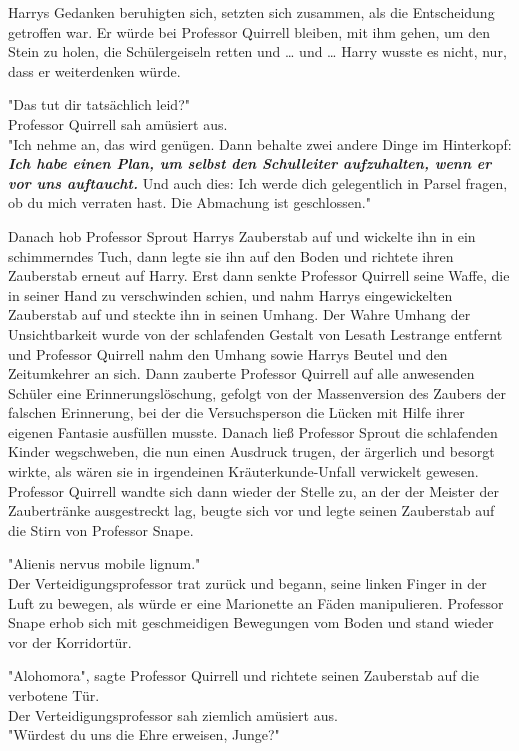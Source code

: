 {Harrys Gedanken beruhigten sich, setzten sich zusammen, als die Entscheidung getroffen war. Er würde bei Professor Quirrell bleiben, mit ihm gehen, um den Stein zu holen, die Schülergeiseln retten und … und … Harry wusste es nicht, nur, dass er weiterdenken würde.

"Das tut dir tatsächlich leid?"\\ Professor Quirrell sah amüsiert aus.\\ "Ich nehme an, das wird genügen. Dann behalte zwei andere Dinge im Hinterkopf: \textbf{\emph{Ich habe einen Plan, um selbst den Schulleiter aufzuhalten, wenn er vor uns auftaucht.}} Und auch dies: Ich werde dich gelegentlich in Parsel fragen, ob du mich verraten hast. Die Abmachung ist geschlossen."

Danach hob Professor Sprout Harrys Zauberstab auf und wickelte ihn in ein schimmerndes Tuch, dann legte sie ihn auf den Boden und richtete ihren Zauberstab erneut auf Harry. Erst dann senkte Professor Quirrell seine Waffe, die in seiner Hand zu verschwinden schien, und nahm Harrys eingewickelten Zauberstab auf und steckte ihn in seinen Umhang. Der Wahre Umhang der Unsichtbarkeit wurde von der schlafenden Gestalt von Lesath Lestrange entfernt und Professor Quirrell nahm den Umhang sowie Harrys Beutel und den Zeitumkehrer an sich. Dann zauberte Professor Quirrell auf alle anwesenden Schüler eine Erinnerungslöschung, gefolgt von der Massenversion des Zaubers der falschen Erinnerung, bei der die Versuchsperson die Lücken mit Hilfe ihrer eigenen Fantasie ausfüllen musste. Danach ließ Professor Sprout die schlafenden Kinder wegschweben, die nun einen Ausdruck trugen, der ärgerlich und besorgt wirkte, als wären sie in irgendeinen Kräuterkunde-Unfall verwickelt gewesen. Professor Quirrell wandte sich dann wieder der Stelle zu, an der der Meister der Zaubertränke ausgestreckt lag, beugte sich vor und legte seinen Zauberstab auf die Stirn von Professor Snape.

"Alienis nervus mobile lignum."\\ Der Verteidigungsprofessor trat zurück und begann, seine linken Finger in der Luft zu bewegen, als würde er eine Marionette an Fäden manipulieren. Professor Snape erhob sich mit geschmeidigen Bewegungen vom Boden und stand wieder vor der Korridortür.

"Alohomora", sagte Professor Quirrell und richtete seinen Zauberstab auf die verbotene Tür.\\ Der Verteidigungsprofessor sah ziemlich amüsiert aus.\\ "Würdest du uns die Ehre erweisen, Junge?"

}
